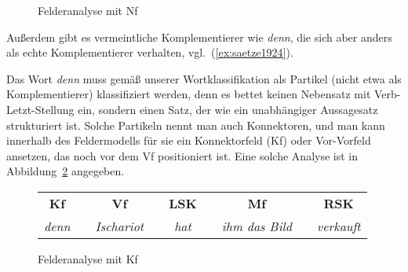 
\begin{figure}
  \centering
  \caption{Felderanalyse mit Nf}
  \label{fig:nachfeld}
\end{figure}

Außerdem gibt es vermeintliche Komplementierer wie \textit{denn}, die sich aber anders als echte Komplementierer verhalten, vgl.\ (\ref{ex:saetze1924}).

\begin{exe}
  \ex\label{ex:saetze1924}
  \begin{xlist}
  \end{xlist}
\end{exe}


Das Wort \textit{denn} muss gemäß unserer Wortklassifikation als Partikel (nicht etwa als Komplementierer) klassifiziert werden, denn es bettet keinen Nebensatz mit Verb-Letzt-Stellung ein, sondern einen Satz, der wie ein unabhängiger Aussagesatz strukturiert ist.
Solche Partikeln nennt man auch Konnektoren, und man kann innerhalb des Feldermodells für sie ein Konnektorfeld (Kf) oder Vor-Vorfeld ansetzen, das noch vor dem Vf positioniert ist.
Eine solche Analyse ist in Abbildung~\ref{fig:konnektorfeld} angegeben.

\begin{figure}
  \centering
  \begin{tabular}{cp{0.1em}cp{0.1em}cp{0.1em}cp{0.1em}c}
    \textbf{Kf} && \textbf{Vf} && \textbf{LSK} && \textbf{Mf} && \textbf{RSK} \\
    \cmidrule{1-1}\cmidrule{3-3}\cmidrule{5-5}\cmidrule{7-7}\cmidrule{9-9}
    \textit{denn} && \textit{Ischariot} && \textit{hat} && \textit{ihm das Bild} && \textit{verkauft} \\
  \end{tabular}
  \caption{Felderanalyse mit Kf}
  \label{fig:konnektorfeld}
\end{figure}

